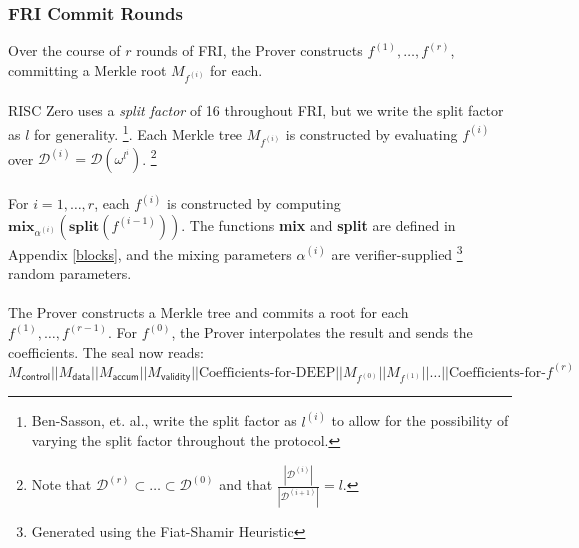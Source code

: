 \documentclass[10pt,letterpaper,titlepage]{article}
\newcommand{\w}[0]{\omega}
\newcommand{\D}[0]{\mathcal{D}}
\theoremstyle{definition}
\begin{document}
\begin{appendices}
\subsubsection*{FRI Commit Rounds}
Over the course of $r$ rounds of FRI, the Prover constructs $f^{(1)},\ldots,f^{(r)}$, committing a Merkle root $M_{f^{(i)}}$ for each. \\
\\
RISC Zero uses a \textit{split factor} of 16 throughout FRI, but we write the split factor as $l$ for generality.%
\footnote{Ben-Sasson, et. al., write the split factor as $l^{(i)}$ to allow for the possibility of varying the split factor throughout the protocol.}.
Each Merkle tree $M_{f^{(i)}}$ is constructed by evaluating $f^{(i)}$ over $\D^{(i)}=\D(\w^{l^i})$.%
\footnote{Note that $\D^{(r)}\subset\ldots\subset\D^{(0)}$ and that $\frac{|\D^{(i)}|}{|\D^{(i+1)}|}=l$.}
\\
\\For $i=1,\ldots,r$, each $f^{(i)}$ is constructed by computing $\textbf{mix}_{\alpha^{(i)}}(\textbf{split}(f^{(i-1)}))$. 
The functions \textbf{mix} and \textbf{split} are defined in Appendix \ref{blocks}, and the mixing parameters $\alpha^{(i)}$ are verifier-supplied%
\footnote{Generated using the Fiat-Shamir Heuristic} random parameters.\\
\\
The Prover constructs a Merkle tree and commits a root for each $f^{(1)},\ldots,f^{(r-1)}$. 
For $f^{(0)}$, the Prover interpolates the result and sends the coefficients. 
The seal now reads:
\[
  M_\mathsf{control}||
  M_\mathsf{data}||
  M_\mathsf{accum}||
  M_\mathsf{validity}||
  \text{Coefficients-for-DEEP}||
  M_{f^{(0)}}||
  M_{f^{(1)}}||
  \ldots||
  \text{Coefficients-for-}f^{(r)}
\]


\end{appendices}
\end{document}

